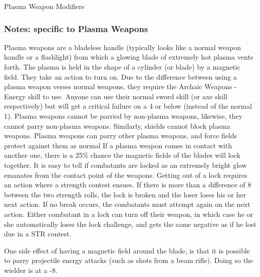 \documentclass[twoside]{book}
\begin{document}
                
              Plasma Weapon Modifiers  
            
\subsubsection{Notes: specific to Plasma Weapons}
      
                   Plasma weapons are a bladeless handle (typically
                   looks like a normal weapon handle or a flashlight)
                   from which a glowing blade of extremely hot plasma
                   vents forth. The plasma is held in the shape of a
                   cylinder (or blade) by a magnetic field. They take an
                   action to turn on. 
                   Due to the difference between using a plasma
                   weapon verses normal weapons, they require the Archaic
                   Weapons - Energy skill to use. Anyone can use their
                   normal sword skill (or axe skill respectively) but
                   will get a critical failure on a 4 or below (instead
                   of the normal 1). 
                   Plasma weapons cannot be parried by non-plasma
                   weapons, likewise, they cannot parry non-plasma
                   weapons. Similarly, shields cannot block plasma
                   weapons. Plasma weapons can parry other plasma
                   weapons, and force fields protect against them as
                   normal If a plasma weapon comes in contact with
                   another one, there is a 25\% chance the magnetic fields
                   of the blades will lock together. It is easy to tell
                   if combatants are locked as an extremely bright glow
                   emanates from the contact point of the weapons.
                   Getting out of a lock requires an action where a
                   strength contest ensues. If there is more than a
                   difference of 8 between the two strength rolls, the
                   lock is broken and the loser loses his or her next
                   action. If no break occurs, the combatants must
                   attempt again on the next action. Either combatant in
                   a lock can turn off their weapon, in which case he or
                   she automatically loses the lock challenge, and gets
                   the same negative as if he lost due in a STR contest.
                   
                   One side effect of having a magnetic field
                   around the blade, is that it is possible to parry
                   projectile energy attacks (such as shots from a beam
                   rifle). Doing so the wielder is at a -8. 
              
\end{document}
